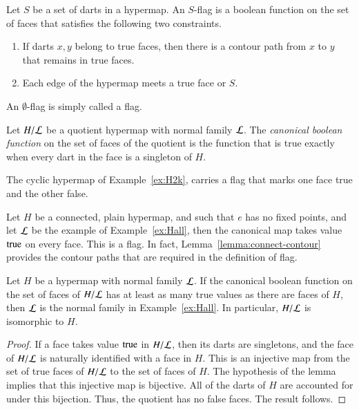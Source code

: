 \begin{definition}[flag]  Let $S$ be a set of darts in a hypermap.  
An $S$-flag is a boolean function on the set of faces that satisfies the following two constraints.
\begin{enumerate}
    \item If darts $x,y$ belong to true faces,
    then there is a contour path from $x$ to $y$ that remains
    in true faces.
    \item Each edge of the hypermap meets a true face or $S$.
    \end{enumerate}
An $\emptyset$-flag is simply called a flag.
\end{definition}

\begin{definition} Let $H/{\cal L}$ be a quotient hypermap with normal family $\cal L$.  The {\it canonical boolean function} on the set of faces of the quotient is the function that is true exactly when every dart in the face is a singleton of $H$.
\end{definition}

\begin{example} The cyclic hypermap of Example~\ref{ex:H2k}, carries a flag that marks one face true and the other false.
\end{example}

\begin{example} Let $H$ be a connected, plain hypermap, and such that $e$ has no fixed points, and let $\cal L$ be the example of Example~\ref{ex:Hall}, then the canonical map takes value ${\operatorname{true}}$ on every face.  This is a flag. In fact, Lemma~\ref{lemma:connect-contour} provides the contour paths that are required in the definition of flag.
\end{example}

\begin{lemma}  
Let $H$ be a hypermap with normal family ${\cal L}$. If the canonical boolean function on the set of faces of $H/{\cal L}$ has at least as many true values as there are faces of $H$, then $\cal L$ is the normal family in Example~\ref{ex:Hall}. In particular, $H/{\cal L}$ is isomorphic to $H$.
\end{lemma}

\begin{proof}  If a face takes value ${\operatorname{true}}$ in $H/{\cal L}$, then its darts are singletons, and the face of $H/{\cal L}$ is naturally identified with a face in $H$.  This is an injective map from the set of true faces of $H/{\cal L}$ to the set of faces of $H$.  The hypothesis of the lemma implies that this injective map is bijective. All of the darts of $H$ are accounted for under this bijection. Thus, the quotient has no false faces.  The result follows.
\end{proof}



